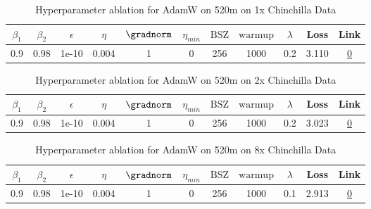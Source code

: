\begin{table}[H]
\centering
\caption{Hyperparameter ablation for AdamW on 520m on 1x Chinchilla Data}
\label{tab:ablation_adamw_520m_1}
\begin{tabular}{ccccccccccc}
\toprule
$\beta_1$ & $\beta_2$ & $\epsilon$ & $\eta$ & $\gradnorm$ & $\eta_{min}$ & $\mathrm{BSZ}$ & $\mathrm{warmup}$ & $\lambda$ & Loss & Link \\
\midrule
0.9 & 0.98 & 1e-10 & 0.004 & 1 & 0 & 256 & 1000 & 0.2 & 3.110 & \href{https://wandb.ai/stanford-mercury/optimizer-scaling/runs/sweep-520m-10B-adamwf7a9c6lr0.004-wd0.2-minlr0-warmup1000-b10.9--0a09ef}{0} \\
\midrule
\bottomrule
\end{tabular}
\end{table}

\begin{table}[H]
\centering
\caption{Hyperparameter ablation for AdamW on 520m on 2x Chinchilla Data}
\label{tab:ablation_adamw_520m_2}
\begin{tabular}{ccccccccccc}
\toprule
$\beta_1$ & $\beta_2$ & $\epsilon$ & $\eta$ & $\gradnorm$ & $\eta_{min}$ & $\mathrm{BSZ}$ & $\mathrm{warmup}$ & $\lambda$ & Loss & Link \\
\midrule
0.9 & 0.98 & 1e-10 & 0.004 & 1 & 0 & 256 & 1000 & 0.2 & 3.023 & \href{https://wandb.ai/stanford-mercury/optimizer-scaling/runs/sweep-520m-21B-adamws9d215dlr0.004-wd0.2-minlr0-warmup1000-b10.9-d16851}{0} \\
\midrule
\bottomrule
\end{tabular}
\end{table}

\begin{table}[H]
\centering
\caption{Hyperparameter ablation for AdamW on 520m on 8x Chinchilla Data}
\label{tab:ablation_adamw_520m_8}
\begin{tabular}{ccccccccccc}
\toprule
$\beta_1$ & $\beta_2$ & $\epsilon$ & $\eta$ & $\gradnorm$ & $\eta_{min}$ & $\mathrm{BSZ}$ & $\mathrm{warmup}$ & $\lambda$ & Loss & Link \\
\midrule
0.9 & 0.98 & 1e-10 & 0.004 & 1 & 0 & 256 & 1000 & 0.1 & 2.913 & \href{https://wandb.ai/stanford-mercury/optimizer-scaling/runs/sweep-520m-85B-adamwf14f39lr0.004-wd0.1-minlr0-warmup1000-b10.9--84afa9}{0} \\
\midrule
\bottomrule
\end{tabular}
\end{table}

